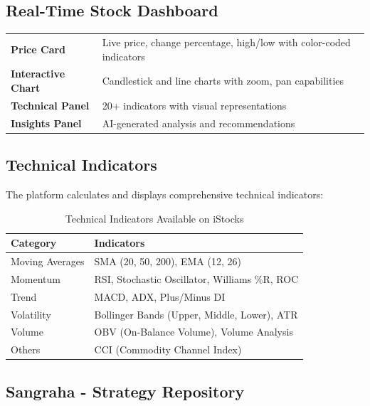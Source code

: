 \documentclass[11pt,a4paper]{article}
\begin{document}
\subsection{Real-Time Stock Dashboard}

\begin{featurebox}
\begin{tabularx}{\textwidth}{lX}
    \textbf{Price Card} & Live price, change percentage, high/low with color-coded indicators \\
    \textbf{Interactive Chart} & Candlestick and line charts with zoom, pan capabilities \\
    \textbf{Technical Panel} & 20+ indicators with visual representations \\
    \textbf{Insights Panel} & AI-generated analysis and recommendations \\
\end{tabularx}
\end{featurebox}

\subsection{Technical Indicators}

The platform calculates and displays comprehensive technical indicators:

\begin{table}[h]
\centering
\begin{tabular}{ll}
\toprule
\textbf{Category} & \textbf{Indicators} \\
\midrule
Moving Averages & SMA (20, 50, 200), EMA (12, 26) \\
Momentum & RSI, Stochastic Oscillator, Williams \%R, ROC \\
Trend & MACD, ADX, Plus/Minus DI \\
Volatility & Bollinger Bands (Upper, Middle, Lower), ATR \\
Volume & OBV (On-Balance Volume), Volume Analysis \\
Others & CCI (Commodity Channel Index) \\
\bottomrule
\end{tabular}
\caption{Technical Indicators Available on iStocks}
\end{table}

\subsection{Sangraha - Strategy Repository}
\end{document}
